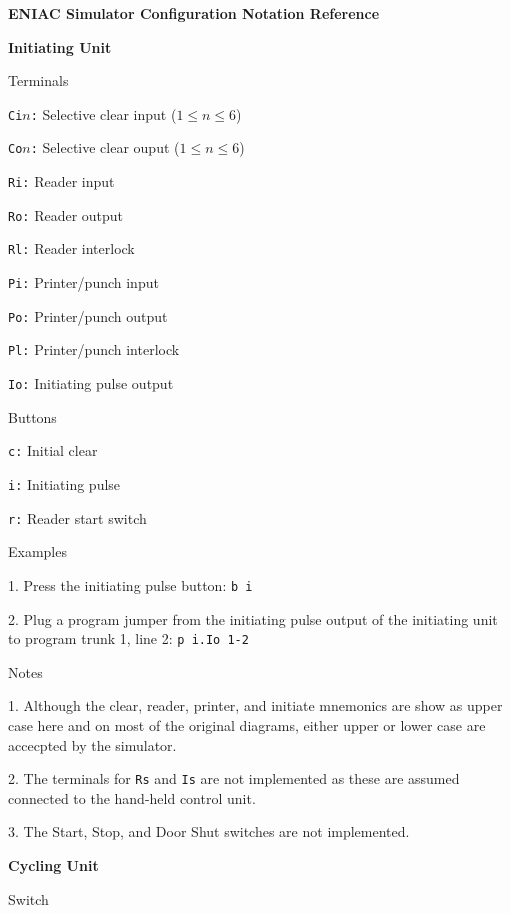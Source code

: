 \centerline{\bf ENIAC Simulator Configuration Notation Reference}
\vskip 12pt
\noindent
{\bf Initiating Unit}

Terminals

{\advance\leftskip 0.5in
\item{\tt Ci$n$:} Selective clear input ($1\le n\le 6$)
\item{\tt Co$n$:} Selective clear ouput ($1\le n\le 6$)
\item{\tt Ri:} Reader input
\item{\tt Ro:} Reader output
\item{\tt Rl:} Reader interlock
\item{\tt Pi:} Printer/punch input
\item{\tt Po:} Printer/punch output
\item{\tt Pl:} Printer/punch interlock
\item{\tt Io:} Initiating pulse output

}

Buttons

{\advance\leftskip 0.5in
\item{\tt c:} Initial clear
\item{\tt i:} Initiating pulse
\item{\tt r:} Reader start switch

}

Examples

{\advance\leftskip 0.5in
\item{1.} Press the initiating pulse button: {\tt b i}
\item{2.} Plug a program jumper from the initiating pulse
output of the initiating unit to program trunk 1, line 2:  {\tt p i.Io 1-2}

}

Notes

{\advance\leftskip 0.5in
\item{1.} Although the clear, reader, printer, and initiate mnemonics
are show as upper case here and on most of the original diagrams,
either upper or lower case are accecpted by the simulator.
\item{2.} The terminals for {\tt Rs} and {\tt Is} are not implemented as these
are assumed connected to the hand-held control unit.
\item{3.} The Start, Stop, and Door Shut switches are not implemented.

}

\vskip 12pt
\noindent
{\bf Cycling Unit}

Switch

